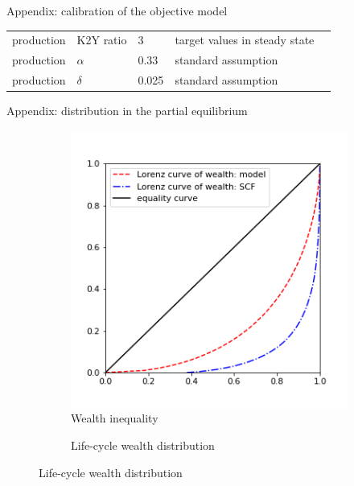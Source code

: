 \documentclass{beamer}
\begin{document}
\begin{frame}{Appendix: calibration of the objective model}
\begin{table}[p]
\begin{adjustbox}{width={0.8\textwidth}}
\begin{tabular}{lllll}
		production        & K2Y ratio                   & 3      & target values in steady state        &  \\
		production        & $\alpha$                    & 0.33   & standard assumption                  &  \\
		production        & $\delta$                    & 0.025  & standard assumption                  & \\
		\hline 
	\end{tabular}
		\end{adjustbox}
	\end{table}
	\hyperlink{objectivemodelresults}{} 
\end{frame}



\begin{frame}{Appendix: distribution in the partial equilibrium}
	\label{appendix:partial_eq}
		\begin{figure}[ht]
		\centering
		\begin{subfigure}[b]{0.30\textwidth}
			\caption{Wealth inequality}
			\includegraphics[width=\textwidth]{figures/lorenz_a_test.png}
		\end{subfigure}
		\begin{subfigure}[b]{0.6\textwidth}
			\caption{Life-cycle wealth distribution}

\end{subfigure}
\end{figure}
\end{frame}
\end{document}
